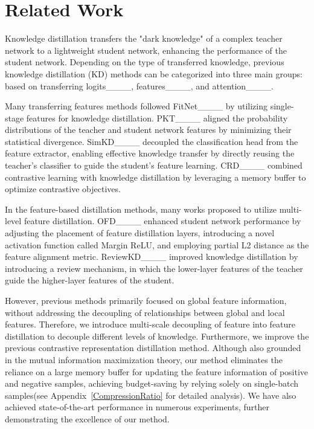 \section{Related Work}
\label{Related_Work}
Knowledge distillation transfers the "dark knowledge" of a complex teacher network to a lightweight student network, enhancing the performance of the student network.
Depending on the type of transferred knowledge, previous knowledge distillation (KD) methods can be categorized into three main groups: based on transferring logits____, features____, and attention____.

Many transferring features methods followed FitNet____ by utilizing single-stage features for knowledge distillation. 
PKT____ aligned the probability distributions of the teacher and student network features by minimizing their statistical divergence. 
SimKD____ decoupled the classification head from the feature extractor, enabling effective knowledge transfer by directly reusing the teacher's classifier to guide the student's feature learning. 
CRD____ combined contrastive learning with knowledge distillation by leveraging a memory buffer to optimize contrastive objectives.

In the feature-based distillation methods, many works proposed to utilize multi-level feature distillation.
OFD____ enhanced student network performance by adjusting the placement of feature distillation layers, introducing a novel activation function called Margin ReLU, and employing partial L2 distance as the feature alignment metric.
ReviewKD____ improved knowledge distillation by introducing a review mechanism, in which the lower-layer features of the teacher guide the higher-layer features of the student.

However, previous methods primarily focused on global feature information, without addressing the decoupling of relationships between global and local features. 
Therefore, we introduce multi-scale decoupling of feature into feature distillation to decouple different levels of knowledge.
Furthermore, we improve the previous contrastive representation distillation method.
Although also grounded in the mutual information maximization theory, our method eliminates the reliance on a large memory buffer for updating the feature information of positive and negative samples, achieving budget-saving by relying solely on single-batch samples(see Appendix~\ref{CompressionRatio} for detailed analysis).
We have also achieved state-of-the-art performance in numerous experiments, further demonstrating the excellence of our method.